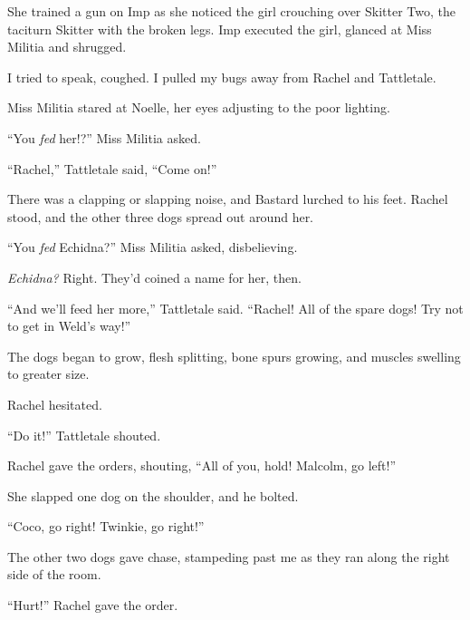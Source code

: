 She trained a gun on Imp as she noticed the girl crouching over Skitter Two, the taciturn Skitter with the broken legs.  Imp executed the girl, glanced at Miss Militia and shrugged.



I tried to speak, coughed.  I pulled my bugs away from Rachel and Tattletale.



Miss Militia stared at Noelle, her eyes adjusting to the poor lighting.



``You \emph{fed} her!?'' Miss Militia asked.



``Rachel,'' Tattletale said, ``Come on!''



There was a clapping or slapping noise, and Bastard lurched to his feet.  Rachel stood, and the other three dogs spread out around her.



``You \emph{fed} Echidna?'' Miss Militia asked, disbelieving.



\emph{Echidna?  }Right.  They'd coined a name for her, then.



``And we'll feed her more,'' Tattletale said.  ``Rachel!  All of the spare dogs!  Try not to get in Weld's way!''



The dogs began to grow, flesh splitting, bone spurs growing, and muscles swelling to greater size.



Rachel hesitated.



``Do it!'' Tattletale shouted.



Rachel gave the orders, shouting, ``All of you, hold!  Malcolm, go left!''



She slapped one dog on the shoulder, and he bolted.



``Coco, go right!  Twinkie, go right!''



The other two dogs gave chase, stampeding past me as they ran along the right side of the room.



``Hurt!''  Rachel gave the order.



